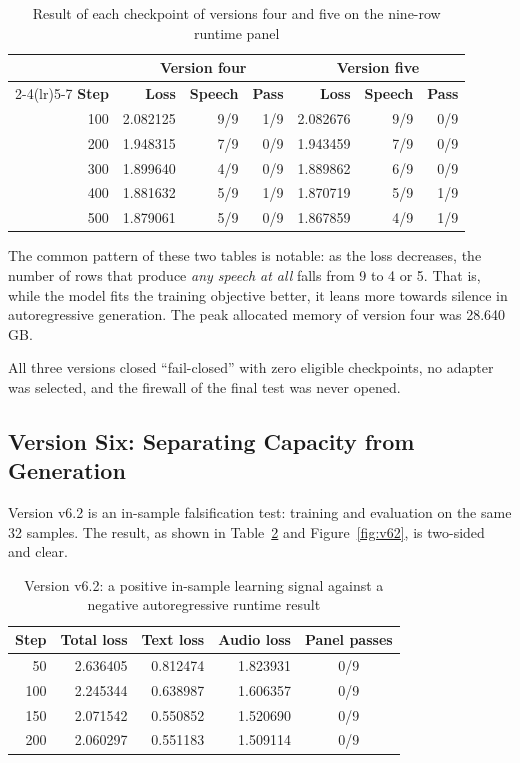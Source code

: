 \begin{table}[ht]
\centering
\caption{Result of each checkpoint of versions four and five on the nine-row runtime panel}
\label{tab:v45}
\small
\begin{tabular}{rrrrrrr}
\toprule
& \multicolumn{3}{c}{\textbf{Version four}} &
  \multicolumn{3}{c}{\textbf{Version five}} \\
\cmidrule(lr){2-4}\cmidrule(lr){5-7}
\textbf{Step} & \textbf{Loss} & \textbf{Speech} & \textbf{Pass} &
                \textbf{Loss} & \textbf{Speech} & \textbf{Pass} \\
\midrule
100 & 2.082125 & 9/9 & 1/9 & 2.082676 & 9/9 & 0/9 \\
200 & 1.948315 & 7/9 & 0/9 & 1.943459 & 7/9 & 0/9 \\
300 & 1.899640 & 4/9 & 0/9 & 1.889862 & 6/9 & 0/9 \\
400 & 1.881632 & 5/9 & 1/9 & 1.870719 & 5/9 & 1/9 \\
500 & 1.879061 & 5/9 & 0/9 & 1.867859 & 4/9 & 1/9 \\
\bottomrule
\end{tabular}
\end{table}

The common pattern of these two tables is notable: as the loss decreases, the number of rows
that produce \emph{any speech at all} falls from 9 to 4 or 5. That is, while the model fits
the training objective better, it leans more towards silence in autoregressive generation.
The peak allocated memory of version four was 28.640 GB.

All three versions closed ``fail-closed'' with zero eligible checkpoints, no adapter was
selected, and the firewall of the final test was never opened.

\subsection{Version Six: Separating Capacity from Generation}

Version v6.2 is an in-sample falsification test: training and evaluation on the same 32
samples. The result, as shown in Table~\ref{tab:v62} and Figure~\ref{fig:v62}, is two-sided
and clear.

\begin{table}[ht]
\centering
\caption{Version v6.2: a positive in-sample learning signal against a negative
         autoregressive runtime result}
\label{tab:v62}
\small
\begin{tabular}{rrrrc}
\toprule
\textbf{Step} & \textbf{Total loss} & \textbf{Text loss} &
\textbf{Audio loss} & \textbf{Panel passes} \\
\midrule
50  & 2.636405 & 0.812474 & 1.823931 & 0/9 \\
100 & 2.245344 & 0.638987 & 1.606357 & 0/9 \\
150 & 2.071542 & 0.550852 & 1.520690 & 0/9 \\
200 & 2.060297 & 0.551183 & 1.509114 & 0/9 \\
\bottomrule
\end{tabular}
\end{table}

